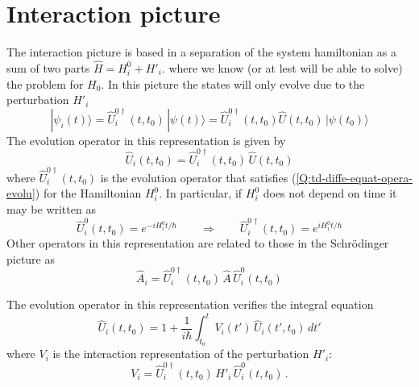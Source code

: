 \section{Interaction picture}
\label{S:interaction-picture}

The interaction picture is based in a separation of the system hamiltonian as a sum of two parts $\hat{H}= H^{0}_{i} + H'_{i}$.
where we know (or at lest will be able to solve) the problem for $H_{0}$. In this picture the states will only evolve due to the perturbation $H'_{i}$
\begin{equation}
  \label{Q:td-inter-pictu-state-evolu}
  |\psi_{i}(t) \rangle =  \hat{U}^{0 \dag}_{i}(t,t_{0}) \, |\psi(t) \rangle =  \hat{U}^{0 \dag}_{i}(t,t_{0}) \hat{U} (t,t_{0}) \, |\psi(t_{0}) \rangle 
\end{equation}
The evolution operator in this representation is given by
\begin{equation}
  \label{Q:td-repre-inter-opera-evol}
  \hat{U}_{i}(t,t_{0})=  \hat{U}^{0 \dag}_{i}(t,t_{0})\, \hat{U}(t,t_{0})
\end{equation}
%
where $ \hat{U}^{0 \dag}_{i}(t,t_{0})$ is the evolution operator that satisfies (\ref{Q:td-diffe-equat-opera-evolu}) for the Hamiltonian $H^{0}_{i}$. In particular, if $H^{0}_{i}$ does not depend on time it may be written as
\begin{equation*}
   \hat{U}^{0}_{i}(t,t_{0})= e^{-i H^{0}_{i} t/\hbar} \qquad \Rightarrow \qquad  \hat{U}^{0 \dag}_{i}(t,t_{0})= e^{i H^{0}_{i} t/\hbar} 
\end{equation*}
 Other operators in this representation are related to those in the Schr\"{o}dinger picture as
\begin{equation*}
  \hat{A}_{i}=  \hat{U}^{0 \dag}_{i}(t,t_{0})\,\hat{A} \,\hat{U}^{0}_{i}(t,t_{0})
\end{equation*}

The evolution operator in this representation verifies the integral equation
\begin{equation*}
  \hat{U}_{i}(t,t_{0}) = 1 + \frac{1}{i\hbar} \int_{t_{0}}^{t} V_{i}(t')\, \hat{U}_{i}(t',t_{0}) \, dt'
\end{equation*}
where $V_{i}$ is the interaction representation of the perturbation $H'_{i}$:
\begin{equation*}
  V_{i}= \hat{U}^{0 \dag}_{i}(t,t_{0})\, H'_{i} \,\hat{U}^{0}_{i}(t,t_{0}) \,.
\end{equation*}

